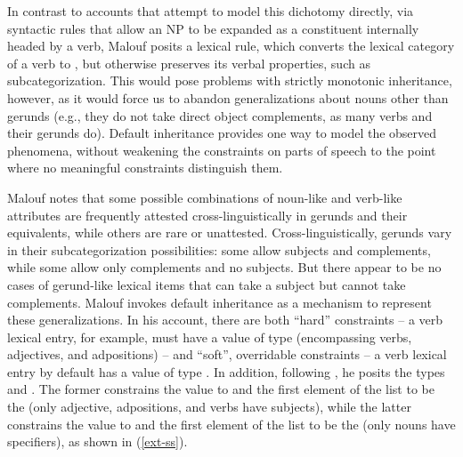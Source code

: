\documentclass[output=paper]{langsci/langscibook}
\begin{document}
\eal
\label{ger-n}
\zl
\eal\label{ger-v}
\zl



In contrast to accounts that attempt to model this dichotomy directly, via syntactic rules that allow an NP to be expanded as a constituent internally headed by a verb, Malouf posits a lexical rule, which converts the lexical category of a verb to , but otherwise preserves its verbal properties, such as subcategorization.
This would pose problems with strictly monotonic inheritance, however, as it would force us to abandon generalizations about nouns other than gerunds (e.g., they do not take direct object complements, as many verbs and their gerunds do).
Default inheritance provides one way to model the observed phenomena, without weakening the constraints on parts of speech to the point where no meaningful constraints distinguish them. 

Malouf notes that some possible combinations of noun-like and verb-like attributes are frequently attested cross-linguistically in gerunds and their equivalents, while others are rare or unattested.
Cross-linguistically, gerunds vary in their subcategorization possibilities: some allow subjects and complements, while some allow only complements and no subjects.
But there appear to be no cases of gerund-like lexical items that can take a subject but cannot take complements.
Malouf invokes default inheritance \citep{LC99a} as a mechanism to represent these generalizations.
In his account, there are both ``hard'' constraints -- a verb lexical entry, for example, must have a  value of type  (encompassing verbs, adjectives, and adpositions) -- and ``soft'', overridable constraints -- a verb lexical entry by default has a  value of type .
In addition, following \citet{Boumaetal2001}, he posits the types  and .
The former constrains the  value to  and the first element of the  list to be the  (only adjective, adpositions, and verbs have subjects), while the latter constrains the  value to  and the first element of the  list to be the  (only nouns have specifiers), as shown in (\ref{ext-ss}).
\end{document}
